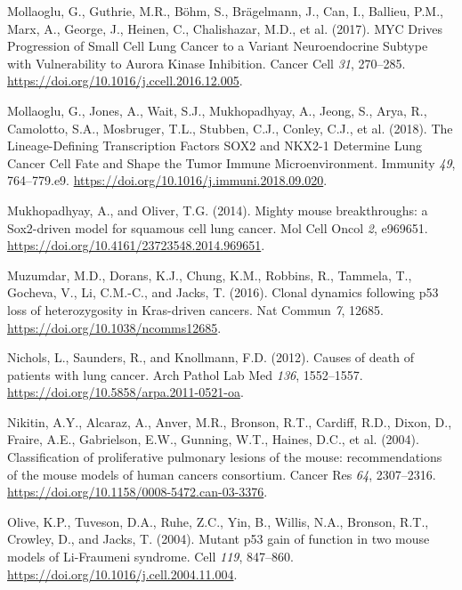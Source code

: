 \begin{CSLReferences}{0}{0}
\leavevmode{}%
Mollaoglu, G., Guthrie, M.R., Böhm, S., Brägelmann, J., Can, I., Ballieu, P.M., Marx, A., George, J., Heinen, C., Chalishazar, M.D., et al. (2017). MYC Drives Progression of Small Cell Lung Cancer to a Variant Neuroendocrine Subtype with Vulnerability to Aurora Kinase Inhibition. Cancer Cell \emph{31}, 270--285. \url{https://doi.org/10.1016/j.ccell.2016.12.005}.

\leavevmode{}%
Mollaoglu, G., Jones, A., Wait, S.J., Mukhopadhyay, A., Jeong, S., Arya, R., Camolotto, S.A., Mosbruger, T.L., Stubben, C.J., Conley, C.J., et al. (2018). The Lineage-Defining Transcription Factors SOX2 and NKX2-1 Determine Lung Cancer Cell Fate and Shape the Tumor Immune Microenvironment. Immunity \emph{49}, 764--779.e9. \url{https://doi.org/10.1016/j.immuni.2018.09.020}.

\leavevmode{}%
Mukhopadhyay, A., and Oliver, T.G. (2014). Mighty mouse breakthroughs: a Sox2-driven model for squamous cell lung cancer. Mol Cell Oncol \emph{2}, e969651. \url{https://doi.org/10.4161/23723548.2014.969651}.

\leavevmode{}%
Muzumdar, M.D., Dorans, K.J., Chung, K.M., Robbins, R., Tammela, T., Gocheva, V., Li, C.M.-C., and Jacks, T. (2016). Clonal dynamics following p53 loss of heterozygosity in Kras-driven cancers. Nat Commun \emph{7}, 12685. \url{https://doi.org/10.1038/ncomms12685}.

\leavevmode{}%
Nichols, L., Saunders, R., and Knollmann, F.D. (2012). Causes of death of patients with lung cancer. Arch Pathol Lab Med \emph{136}, 1552--1557. \url{https://doi.org/10.5858/arpa.2011-0521-oa}.

\leavevmode{}%
Nikitin, A.Y., Alcaraz, A., Anver, M.R., Bronson, R.T., Cardiff, R.D., Dixon, D., Fraire, A.E., Gabrielson, E.W., Gunning, W.T., Haines, D.C., et al. (2004). Classification of proliferative pulmonary lesions of the mouse: recommendations of the mouse models of human cancers consortium. Cancer Res \emph{64}, 2307--2316. \url{https://doi.org/10.1158/0008-5472.can-03-3376}.

\leavevmode{}%
Olive, K.P., Tuveson, D.A., Ruhe, Z.C., Yin, B., Willis, N.A., Bronson, R.T., Crowley, D., and Jacks, T. (2004). Mutant p53 gain of function in two mouse models of Li-Fraumeni syndrome. Cell \emph{119}, 847--860. \url{https://doi.org/10.1016/j.cell.2004.11.004}.


\end{CSLReferences}
